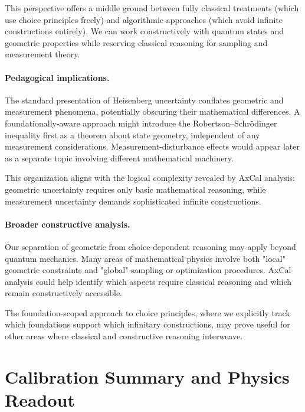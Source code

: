 \documentclass[11pt]{article}
\theoremstyle{plain}
\theoremstyle{definition}
\theoremstyle{remark}
\begin{document}
This perspective offers a middle ground between fully classical treatments (which use choice principles freely) and algorithmic approaches (which avoid infinite constructions entirely). We can work constructively with quantum states and geometric properties while reserving classical reasoning for sampling and measurement theory.

\paragraph{Pedagogical implications.}
The standard presentation of Heisenberg uncertainty conflates geometric and measurement phenomena, potentially obscuring their mathematical differences. A foundationally-aware approach might introduce the Robertson--Schrödinger inequality first as a theorem about state geometry, independent of any measurement considerations. Measurement-disturbance effects would appear later as a separate topic involving different mathematical machinery.

This organization aligns with the logical complexity revealed by AxCal analysis: geometric uncertainty requires only basic mathematical reasoning, while measurement uncertainty demands sophisticated infinite constructions.

\paragraph{Broader constructive analysis.}
Our separation of geometric from choice-dependent reasoning may apply beyond quantum mechanics. Many areas of mathematical physics involve both "local" geometric constraints and "global" sampling or optimization procedures. AxCal analysis could help identify which aspects require classical reasoning and which remain constructively accessible.

The foundation-scoped approach to choice principles, where we explicitly track which foundations support which infinitary constructions, may prove useful for other areas where classical and constructive reasoning interweave.

\section{Calibration Summary and Physics Readout}
\end{document}
